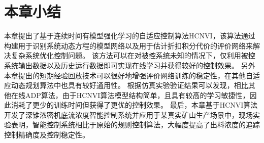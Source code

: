 


\section{本章小结}
\label{sec:conclusion}
本章提出了基于连续时间有模型强化学习的自适应控制算法HCNVI，该算法通过构建用于识别系统动态方程的模型网络以及用于估计折扣积分代价的评价网络来解决复杂系统优化控制问题。
该方法可以在对被控系统未知的情况下，仅利用被控系统输出数据以及历史运行数据即可实现在线学习并获得较好的控制效果。
另外本章提出的短期经验回放技术可以很好地增强评价网络训练的稳定性，在其他自适应动态规划算法中也具有较好通用性。
根据仿真实验验证结果可以发现，相比其他在线ADP算法，由于HCNVI算法模型结构简单，且具有较高的学习敏捷性，因此消耗了更少的训练时间但获得了更优的控制效果。
最后，本章基于HCNVI算法开发了深锥浓密机底流浓度智能控制系统并应用于某真实矿山生产场景中，现场实验表明，智能控制系统相比于原始的规则控制算法，大幅度提高了出料浓度的追踪控制精确度及控制稳定性。